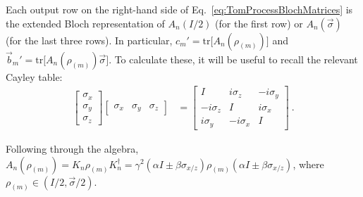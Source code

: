 \documentclass[prx,nofootinbib,onecolumn,showkeys,groupaddress,preprintnumbers,floatfix,
superscriptaddress]{revtex4-1}
\newcommand{\tr}{\text{tr}}
\begin{document}
Each output row 
on the right-hand side of Eq.~\eqref{eq:TomProcessBlochMatrices}
is the extended Bloch representation of $A_n(I/2)$ (for the first row) or $A_n(\vec{\sigma})$ (for the last three rows).
In particular,
$c_m' = \tr \bigl[ A_n(\rho_{(m)}) \bigr]$
and 
$\vec{b}_m' =  \tr \bigl[ A_n(\rho_{(m)}) \vec{\sigma} \bigr] $.
To calculate these, it will be useful to recall 
the relevant Cayley table:
\begin{align}
\begin{bmatrix}
    \sigma_x \\
    \sigma_y \\
    \sigma_z
\end{bmatrix}
\begin{bmatrix}
    \sigma_x &
    \sigma_y &
    \sigma_z
\end{bmatrix}
&= 
\begin{bmatrix}
    I & i \sigma_z & -i \sigma_y \\
    -i \sigma_z & I & i \sigma_x \\
    i \sigma_y & -i \sigma_x & I 
\end{bmatrix} ~.
\end{align}

Following through the algebra,
$A_n(\rho_{(m)}) = K_n \rho_{(m)} K_n^\dagger = \gamma^2 (\alpha I \pm \beta \sigma_{x/z}) \rho_{(m)} (\alpha I \pm \beta \sigma_{x/z})$,
where $\rho_{(m)} \in (I/2, \vec{\sigma}/2) $.
\end{document}
